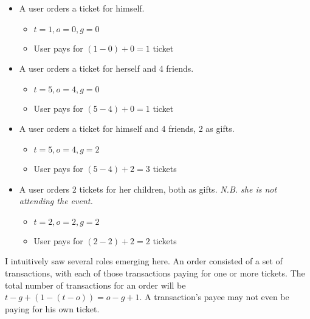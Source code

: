 \documentclass[12pt,a4]{bhamdissertation}
\begin{document}
\begin{itemize}
    \item A user orders a ticket for himself.
    \begin{itemize}
        \item $t = 1, o = 0, g = 0$
        \item User pays for $(1 - 0) + 0 = 1$ ticket
    \end{itemize}
    \item A user orders a ticket for herself and 4 friends.
    \begin{itemize}
        \item $t = 5, o = 4, g = 0$
        \item User pays for $(5 - 4) + 0 = 1$ ticket
    \end{itemize}
    \item A user orders a ticket for himself and 4 friends, 2 as gifts.
    \begin{itemize}
        \item $t = 5, o = 4, g = 2$
        \item User pays for $(5 - 4) + 2 = 3$ tickets
    \end{itemize}
    \item A user orders 2 tickets for her children, both as gifts.
    \textit{N.B. she is not attending the event.}
    \begin{itemize}
        \item $t = 2, o = 2, g = 2$
        \item User pays for $(2 - 2) + 2 = 2$ tickets
    \end{itemize}
\end{itemize}

I intuitively saw several roles emerging here. An order consisted of a set of transactions, with each of those transactions paying for one or more tickets. The total number of transactions for an order will be $t - g + (1 - (t - o)) = o - g + 1$. A transaction's payee may not even be paying for his own ticket.

\end{document}
